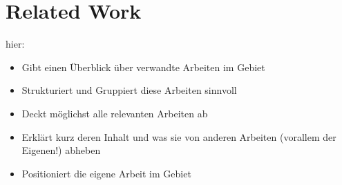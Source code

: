 \chapter{Related Work}\label{kap:related_work}

hier:
\begin{itemize}
    \item Gibt einen Überblick über verwandte Arbeiten im Gebiet
    \item Strukturiert und Gruppiert diese Arbeiten sinnvoll
    \item Deckt möglichst alle relevanten Arbeiten ab
    \item Erklärt kurz deren Inhalt und was sie von anderen Arbeiten (vorallem der Eigenen!) abheben
    \item Positioniert die eigene Arbeit im Gebiet
\end{itemize}